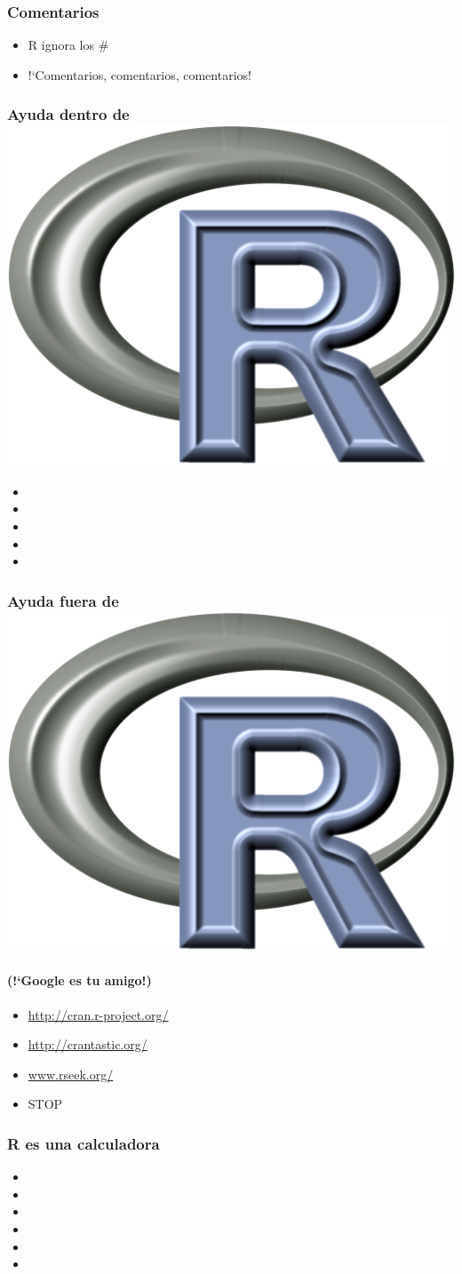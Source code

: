 \documentclass[mathserif]{beamer}
\newcommand{\Rlogo}{\protect\includegraphics[height=2.5ex,keepaspectratio]{Rlogo.png}}%
\begin{document}
\begin{frame}[plain,label=d7]%
   \frametitle{Comentarios}
   \begin{itemize}
      \item R ignora los $\#$
      \item !`Comentarios, comentarios, comentarios!
   \end{itemize}
\end{frame}%

\begin{frame}[plain,label=d7bis]%
\frametitle{Ayuda dentro de \Rlogo}
\begin{itemize}
   \item {}
   \item {}
   \item {}
   \item {}
   \item {}
\end{itemize}
\end{frame}%

\begin{frame}[plain,label=d8]%
   \frametitle{Ayuda fuera de \Rlogo}
   \framesubtitle{(!`Google es tu amigo!)}
   \begin{itemize}
      \item \url{http://cran.r-project.org/}
      \item \url{http://crantastic.org/}
      \item \url{www.rseek.org/}
      \item \url{} STOP
   \end{itemize}
\end{frame}%

\begin{frame}[plain,label=d9]%
   \frametitle{R es una calculadora}
   \begin{itemize}
      \item {}
      \item {}
      \item {}
      \item {}
      \item {}
      \item {}
   \end{itemize}
\end{frame}%
\end{document}
